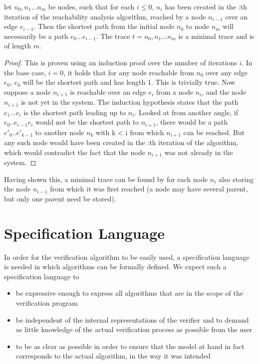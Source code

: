 \begin{lemma}
let $n_0,n_1\ldots n_m$ be nodes, such that for each $i \leq 0$, $n_i$ has been created in the :th iteration of the reachability analysis algorithm, reached by a node $n_{i-1}$ over an edge $e_{i-1}$. Then the shortest path from the initial node $n_0$ to node $n_m$ will necessarily be a path $e_0...e_{i-1}$. The trace $t = n_0,n_1\ldots n_m$ is a minimal trace and is of length $m$.
\end{lemma}

\begin{proof}
This is proven using an induction proof over the number of iterations $i$. In the base case, $i=0$, it holds that for any node reachable from $n_0$ over any edge $e_0$, $e_0$ will be the shortest path and has length 1. This is trivially true. Now suppose a node $n_{i+1}$ is reachable over an edge $e_i$ from a node $n_i$, and the node $n_{i+1}$ is not yet in the system. The induction hypothesis states that the path $e_1...e_i$ is the shortest path leading up to $n_i$.
Looked at from another angle, if $e_0..e_{i-1}e_i$ would not be the shortest path to $n_{i+1}$, there would be a path $e'_0..e'_{k-1}$ to another node $n_k$ with k < i from which $n_{i+1}$ can be reached. But any such node would have been created in the :th iteration of the algorithm, which would contradict the fact that the node $n_{i+1}$ was not already in the system.
\end{proof}

Having shown this, a minimal trace can be found by for each node $n_i$ also storing the node $n_{i-1}$ from which it was first reached (a node may have several parent, but only one parent need be stored). 

\newpage
\section{Specification Language}
\label{speclang}
In order for the verification algorithm to be easily used, a specification language is needed in which algorithms can be formally defined. We expect such a specification language to

\begin{itemize}
\item
be expressive enough to express all algorithms that are in the scope of the verification program
\item
be independent of the internal representations of the verifier and to demand as little knowledge of the actual verification process as possible from the user
\item
to be as clear as possible in order to ensure that the model at hand in fact corresponds to the actual algorithm, in the way it was intended
\end{itemize}

